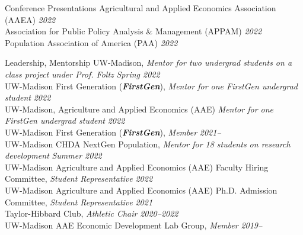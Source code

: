 \documentclass{resume} %
\begin{document}
\begin{rSection}{Conference Presentations} 
	Agricultural and Applied Economics Association (AAEA) {\hfill \em 2022}\\
	Association for Public Policy Analysis \& Management (APPAM) {\hfill \em 2022} \\
	Population Association of America (PAA) {\hfill \em 2022}






	
	
	
	
	
	
\end{rSection}
	
\begin{rSection}{Leadership, Mentorship}%
UW-Madison, \textit{Mentor for two undergrad students on a class project under Prof. Foltz} {\hfill\textit{Spring 2022}}\\ 
UW-Madison First Generation (\textbf{\textit{FirstGen}}), \textit{Mentor for one FirstGen undergrad student} {\hfill\textit{2022}}\\
UW-Madison, Agriculture and Applied Economics (AAE) \textit{Mentor for one FirstGen undergrad student} {\hfill\textit{2022}}\\
UW-Madison First Generation (\textbf{\textit{FirstGen}}), \textit{Member} {\hfill\textit{ 2021--}}\\
UW-Madison CHDA NextGen Population, \textit{Mentor for 18 students on research development} {\hfill\textit{ Summer 2022}}\\
UW-Madison Agriculture and Applied Economics (AAE) Faculty Hiring Committee, \textit{Student Representative} {\hfill \textit{2022}}\\
UW-Madison Agriculture and Applied Economics (AAE) Ph.D. Admission Committee, \textit{Student Representative} {\hfill \textit{2021}}\\
Taylor-Hibbard Club, \textit{Athletic Chair} {\hfill \textit{2020--2022}} \\
UW-Madison AAE Economic Development Lab Group, \textit{Member} {\hfill \textit{2019--}}
\end{rSection}
\end{document}
